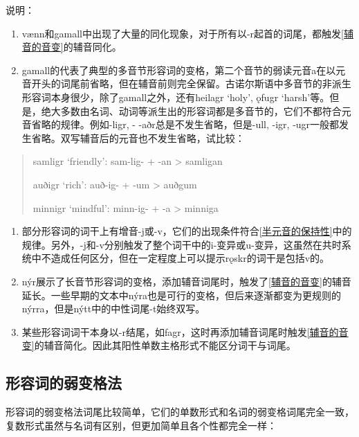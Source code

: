说明：

\begin{enumerate}
\def\labelenumi{\arabic{enumi})}
\item
  vænn和gamall中出现了大量的同化现象，对于所有以-r起首的词尾，都触发\ref{辅音的音变}的辅音同化。
\item
  gamall的代表了典型的多音节形容词的变格，第二个音节的弱读元音a在以元音开头的词尾前省略，但在辅音前则完全保留。古诺尔斯语中多音节的非派生形容词本身很少，除了gamall之外，还有heilagr
  `holy', ǫfugr
  `harsh'等。但是，绝大多数由名词、动词等派生出的形容词都是多音节的，它们不都符合元音省略的规律。例如-ligr,
  - -aðr总是不发生省略，但是-ull, -igr,
  -ugr一般都发生省略。双写辅音后的元音也不发生省略，试比较：
\end{enumerate}

\begin{quote}
samligr `friendly': sam-lig- + -an \textgreater{} samligan

auðigr `rich': auð-ig- + -um \textgreater{} auðgum

minnigr `mindful': minn-ig- + -a \textgreater{} minniga
\end{quote}

\begin{enumerate}
\def\labelenumi{\arabic{enumi})}
\setcounter{enumi}{2}
\item
  部分形容词的词干上有增音-j或-v，它们的出现条件符合\ref{半元音的保持性}中的规律。另外，-j和-v分别触发了整个词干中的i-变异或u-变异，这虽然在共时系统中不造成任何区分，但在一定程度上可以提示rǫskr的词干是包括v的。
\item
  nýr展示了长音节形容词的变格，添加辅音词尾时，触发了\ref{辅音的音变}的辅音延长。一些早期的文本中nýra也是可行的变格，但后来逐渐都变为更规则的nýrra，但是nýtt中的中性词尾-t始终双写。
\item
  某些形容词词干本身以-r结尾，如fagr，这时再添加辅音词尾时触发\ref{辅音的音变}的辅音简化。因此其阳性单数主格形式不能区分词干与词尾。
\end{enumerate}

\subsection{形容词的弱变格法}\label{形容词的弱变格法}

形容词的弱变格法词尾比较简单，它们的单数形式和名词的弱变格词尾完全一致，复数形式虽然与名词有区别，但更加简单且各个性都完全一样：

